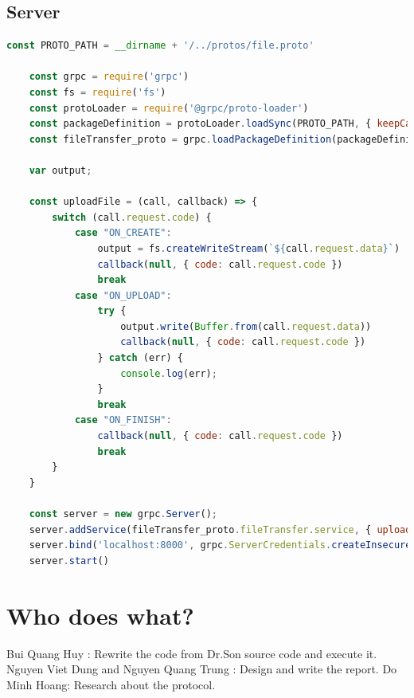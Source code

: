 \documentclass{article}
\begin{document}
\subsection{Server}
\begin{lstlisting}[language=javascript]
    const PROTO_PATH = __dirname + '/../protos/file.proto'

    const grpc = require('grpc')
    const fs = require('fs')
    const protoLoader = require('@grpc/proto-loader')
    const packageDefinition = protoLoader.loadSync(PROTO_PATH, { keepCase: true, longs: String, enums: String, defaults: true, oneofs: true })
    const fileTransfer_proto = grpc.loadPackageDefinition(packageDefinition).fileTransfer
    
    var output;
    
    const uploadFile = (call, callback) => {
        switch (call.request.code) {
            case "ON_CREATE":
                output = fs.createWriteStream(`${call.request.data}`)
                callback(null, { code: call.request.code })
                break
            case "ON_UPLOAD":
                try {
                    output.write(Buffer.from(call.request.data))
                    callback(null, { code: call.request.code })
                } catch (err) {
                    console.log(err);
                }
                break
            case "ON_FINISH":
                callback(null, { code: call.request.code })
                break
        }
    }
    
    const server = new grpc.Server();
    server.addService(fileTransfer_proto.fileTransfer.service, { uploadFile: uploadFile })
    server.bind('localhost:8000', grpc.ServerCredentials.createInsecure())
    server.start()
\end{lstlisting}

\section{Who does what?}
    Bui Quang Huy : Rewrite the code from Dr.Son source code and execute it.
    \newline
    Nguyen Viet Dung and Nguyen Quang Trung : Design and write the report.
    \newline
    Do Minh Hoang: Research about the protocol.
\end{document}
